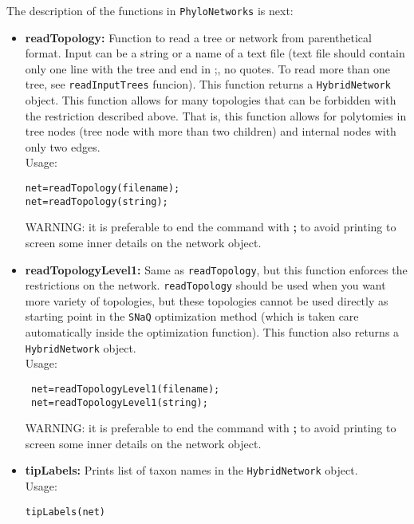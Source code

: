 \documentclass[12pt]{article}
\begin{document}
The description of the
functions in \texttt{PhyloNetworks} is next:
\begin{itemize}
\item \textbf{readTopology:} Function to read a tree or network from
  parenthetical format. Input can be a string or a name of a text file
  (text file should contain only one line with the tree and end in ;,
  no quotes. To read more than one tree, see \texttt{readInputTrees}
  funcion). This function returns a \texttt{HybridNetwork} object. This
  function allows for many topologies that can be forbidden with the
  restriction described above. That is, this function allows for
  polytomies in tree nodes (tree node with more than two children) and
  internal nodes with only two edges.
\\Usage:
\begin{lstlisting}
net=readTopology(filename);
net=readTopology(string);
\end{lstlisting}
WARNING: it is preferable to end the command with \textbf{;} to avoid
printing to screen some inner details on the network object.


\item \textbf{readTopologyLevel1:} Same as \texttt{readTopology}, but
  this function enforces the restrictions on the network. \texttt{readTopology}
  should be used when you want more variety of topologies, but these
  topologies cannot be used directly as starting point in the
  \texttt{SNaQ} optimization method (which is taken care automatically
  inside the optimization function). This
  function also returns a \texttt{HybridNetwork} object. \\
  Usage:
\begin{lstlisting}
 net=readTopologyLevel1(filename);
 net=readTopologyLevel1(string);
\end{lstlisting}
WARNING: it is preferable to end the command with \textbf{;} to avoid
printing to screen some inner details on the network object.


\item \textbf{tipLabels:} Prints list of taxon names in the \texttt{HybridNetwork}
  object.\\
Usage:
\begin{lstlisting}
tipLabels(net)
\end{lstlisting}


\end{itemize}
\end{document}
